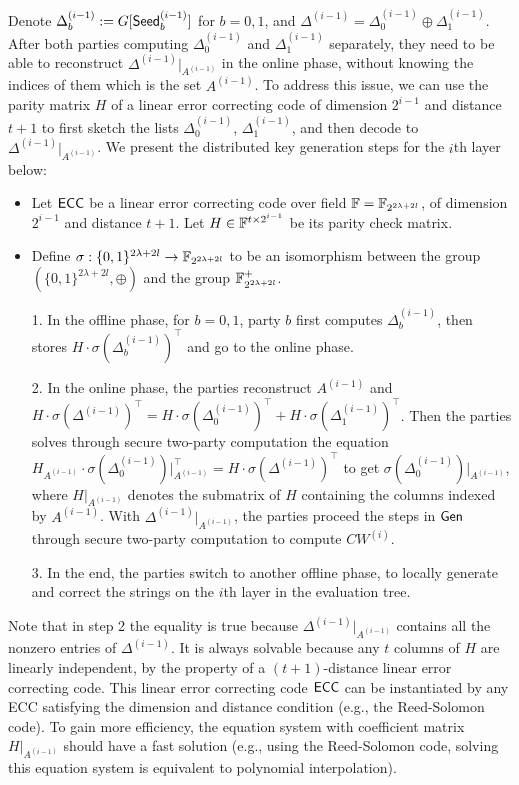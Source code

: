Denote $\Delta_b^{(i-1)}:=G[{\sf Seed}_b^{(i-1)}]$ for $b=0,1$, and $\Delta^{(i-1)} = \Delta_0^{(i-1)}\oplus \Delta_1^{(i-1)}$. After both parties computing $\Delta_0^{(i-1)}$ and $\Delta_1^{(i-1)}$ separately, they need to be able to reconstruct $\Delta^{(i-1)}|_{A^{(i-1)}}$ in the online phase, without knowing the indices of them which is the set $A^{(i-1)}$. 
To address this issue, we can use the parity matrix $H$ of a linear error correcting code of dimension $2^{i-1}$ and distance $t+1$ to first sketch the lists $\Delta_0^{(i-1)}$, $\Delta_1^{(i-1)}$, and then decode to $\Delta^{(i-1)}|_{A^{(i-1)}}$. We present the distributed key generation steps for the $i$th layer below: 
\begin{itemize}
    \item Let ${\sf ECC}$ be a linear error correcting code over field $\mathbb{F} = \mathbb{F}_{2^{2\lambda+2l}}$, of dimension $2^{i-1}$ and distance $t+1$. Let $H\in \mathbb{F}^{t\times 2^{i-1}}$ be its parity check matrix. 
    \item Define $\sigma:\{0,1\}^{2\lambda+2l}\rightarrow \mathbb{F}_{2^{2\lambda+2l}}$ to be an isomorphism between the group $(\{0,1\}^{2\lambda+2l},\oplus)$ and the group $\mathbb{F}_{2^{2\lambda+2l}}^+$. 
    \item[1.] In the offline phase, for $b = 0,1$, party $b$ first computes $\Delta_b^{(i-1)}$, then stores $H\cdot \sigma(\Delta_b^{(i-1)})^\top$ and go to the online phase. 
    \item[2.]\label{dgen_SD} In the online phase, the parties reconstruct $A^{(i-1)}$ and $H\cdot \sigma(\Delta^{(i-1)})^\top = H\cdot \sigma(\Delta_0^{(i-1)})^\top + H\cdot \sigma(\Delta_1^{(i-1)})^\top$. Then the parties solves through secure two-party computation the equation $H_{A^{(i-1)}}\cdot \sigma(\Delta_0^{(i-1)})|_{A^{(i-1)}}^\top = H\cdot \sigma(\Delta^{(i-1)})^\top$ to get $\sigma(\Delta_0^{(i-1)})|_{A^{(i-1)}}$, where $H|_{A^{(i-1)}}$ denotes the submatrix of $H$ containing the columns indexed by $A^{(i-1)}$. With $\Delta^{(i-1)}|_{A^{(i-1)}}$, the parties proceed the steps in ${\sf Gen}$ through secure two-party computation to compute $CW^{(i)}$.
    \item[3.] In the end, the parties switch to another offline phase, to locally generate and correct the strings on the $i$th layer in the evaluation tree. 
\end{itemize}
Note that in step 2 the equality is true because $\Delta^{(i-1)}|_{A^{(i-1)}}$ contains all the nonzero entries of $\Delta^{(i-1)}$. It is always solvable because any $t$ columns of $H$ are linearly independent, by the property of a $(t+1)$-distance linear error correcting code. This linear error correcting code ${\sf ECC}$ can be instantiated by any ECC satisfying the dimension and distance condition (e.g., the Reed-Solomon code). To gain more efficiency, the equation system with coefficient matrix $H|_{A^{(i-1)}}$ should have a fast solution (e.g., using the Reed-Solomon code, solving this equation system is equivalent to polynomial interpolation). 

